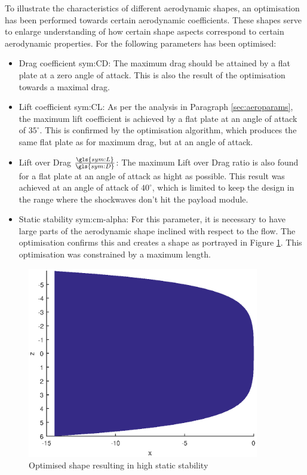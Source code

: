 To illustrate the characteristics of different aerodynamic shapes, an optimisation has been performed towards certain aerodynamic coefficients. These shapes serve to enlarge understanding of how certain shape aspects correspond to certain aerodynamic properties. For the following parameters has been optimised:
\begin{itemize}
	\item Drag coefficient \gls{sym:CD}: The maximum drag should be attained by a flat plate at a zero angle of attack. This is also the result of the optimisation towards a maximal drag.
	\item Lift coefficient \gls{sym:CL}: As per the analysis in Paragraph \ref{sec:aeroparams}, the maximum lift coefficient is achieved by a flat plate at an angle of attack of $35^\circ$. This is confirmed by the optimisation algorithm, which produces the same flat plate as for maximum drag, but at an angle of attack.
	\item Lift over Drag $\frac{\gls{sym:L}}{\gls{sym:D}}$: The maximum Lift over Drag ratio is also found for a flat plate at an angle of attack as hight as possible. This result was achieved at an angle of attack of $40^\circ$, which is limited to keep the design in the range where the shockwaves don't hit the payload module.
	\item Static stability \gls{sym:cm-alpha}: For this parameter, it is necessary to have large parts of the aerodynamic shape inclined with respect to the flow. The optimisation confirms this and creates a shape as portrayed in Figure \ref{fig:highcmalphashape}. This optimisation was constrained by a maximum length.
\end{itemize}


\begin{figure} \label{fig:highcmalphashape}
	\includegraphics[width=0.9\textwidth]{./Figure/Aerodynamics/cmalphamax.eps}
	\caption{Optimised shape resulting in high static stability}
\end{figure}
	

